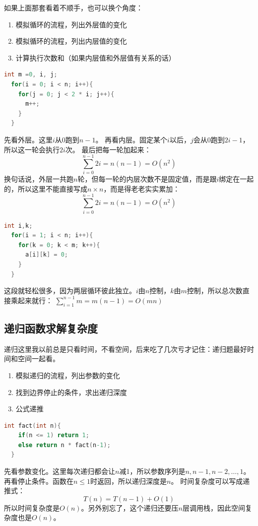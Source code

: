 \documentclass[b5paper,11pt]{article}
\begin{document}
如果上面那套看着不顺手，也可以换个角度：
\begin{enumerate}
  \item 模拟循环的流程，列出外层值的变化
  \item 模拟循环的流程，列出内层值的变化
  \item 计算执行次数和（如果内层值和外层值有关系的话）
\end{enumerate}

\vspace{0.5em}

\begin{lstlisting}[language=C]
  int m =0, i, j;
  for(i = 0; i < n; i++){
    for(j = 0; j < 2 * i; j++){
      m++;
    }
  }
\end{lstlisting}
先看外层。这里$i$从0跑到$n-1$。
再看内层。固定某个$i$以后，$j$会从0跑到$2i-1$，所以这一轮会执行$2i$次。
最后把每一轮加起来：
$$\sum_{i=0}^{n-1} 2i = n(n-1) = O(n^2)$$
换句话说，外层一共跑$n$轮，但每一轮的内层次数不是固定值，而是跟$i$绑定在一起的，所以这里不能直接写成$n \times n$，而是得老老实实累加：
$$\sum_{i=0}^{n-1} 2i = n(n-1) = O(n^2)$$

\begin{lstlisting}[language=C]
  int i,k;
  for(i = 1; i < n; i++){
    for(k = 0; k < m; k++){
      a[i][k] = 0;
    }
  }
\end{lstlisting}
这段就轻松很多，因为两层循环彼此独立。$i$由$n$控制，$k$由$m$控制，所以总次数直接乘起来就行：
$\sum_{i=1}^{n-1} m = m(n-1) = O(mn)$
\subsection{递归函数求解复杂度}
递归这里我以前总是只看时间，不看空间，后来吃了几次亏才记住：递归题最好时间和空间一起看。
\begin{enumerate}
  \item 模拟递归的流程，列出参数的变化
  \item 找到边界停止的条件，求出递归深度
  \item 公式递推
\end{enumerate}

\begin{lstlisting}[language=C]
  int fact(int n){
    if(n <= 1) return 1;
    else return n * fact(n-1);
  }
\end{lstlisting}
先看参数变化。这里每次递归都会让$n$减1，所以参数序列是$n, n-1, n-2, \dots, 1$。
再看停止条件。函数在$n \leq 1$时返回，所以递归深度是$n$。
时间复杂度可以写成递推式：
$$T(n) = T(n-1) + O(1)$$
所以时间复杂度是$O(n)$。另外别忘了，这个递归还要压$n$层调用栈，因此空间复杂度也是$O(n)$。
\end{document}
